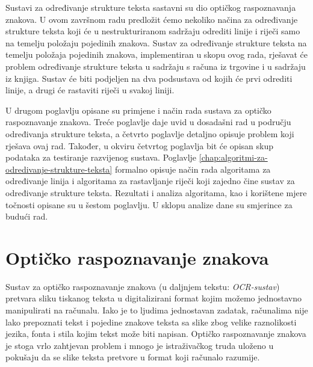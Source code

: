 \documentclass[times, utf8, zavrsni]{fer}
\begin{document}
Sustavi za određivanje strukture teksta sastavni su dio optičkog raspoznavanja
znakova. U ovom završnom radu predložit ćemo nekoliko načina za određivanje
strukture teksta koji će u nestrukturiranom sadržaju odrediti linije i riječi
samo na temelju položaju pojedinih znakova. Sustav za određivanje strukture
teksta na temelju položaja pojedinih znakova, implementiran u skopu ovog rada,
rješavat će problem određivanje strukture teksta u sadržaju s računa iz
trgovine i u sadržaju iz knjiga. Sustav će biti podjeljen na dva podsustava od
kojih će prvi odrediti linije, a drugi će rastaviti riječi u svakoj liniji.

U drugom poglavlju opisane su primjene i način rada sustava za optičko
raspoznavanje znakova. Treće poglavlje daje uvid u dosadašni rad u području
određivanja strukture teksta, a četvrto poglavlje detaljno opisuje problem koji
rješava ovaj rad. Također, u okviru četvrtog poglavlja bit će opisan skup
podataka za testiranje razvijenog sustava. Poglavlje
\ref{chap:algoritmi-za-odredivanje-strukture-teksta} formalno opisuje način rada
algoritama za određivanje linija i algoritama za rastavljanje riječi koji
zajedno čine sustav za određivanje strukture teksta. Rezultati i analiza
algoritama, kao i korištene mjere točnosti opisane su u šestom poglavlju. U
sklopu analize dane su smjerince za budući rad.
















\chapter{Optičko raspoznavanje znakova}
\label{chap:opticko-raspoznavanje-znakova}
Sustav za optičko raspoznavanje znakova  (u
daljnjem tekstu: \emph{OCR-sustav})
pretvara sliku tiskanog teksta u digitalizirani format kojim možemo jednostavno
manipulirati na računalu.
Iako je to ljudima jednostavan zadatak, računalima nije lako prepoznati tekst i
pojedine znakove teksta sa slike
zbog velike raznolikosti jezika, fonta i stila kojim tekst može biti napisan.
Optičko raspoznavanje znakova je stoga vrlo zahtjevan problem i mnogo je
istraživačkog truda uloženo u pokušaju
da se slike teksta pretvore u format koji računalo razumije. \citep
{DBLP:journals/corr/abs-1710-05703}
\end{document}
